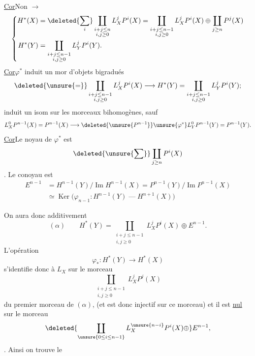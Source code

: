 \uline{Cor}\qquad Non $\longrightarrow$
\[
\left\{\begin{aligned}
H^*(X)&=\deleted{\sum_i}\coprod_{\substack{i+j\leq n\\i,j\geq0}}L_X^jP^i(X)
=\coprod_{\substack{i+j\leq n-1\\i,j\geq0}}L_X^jP^i(X)\oplus\coprod_{j\geq n}P^j(X)\\
H^*(Y)&=\coprod_{\substack{i+j\leq n-1\\i,j\geq0}}L_Y^jP^i(Y).
\end{aligned}\right.
\]
\uline{Cor}\qquad $\varphi^*$ induit un mor d'objets bigradués
\[
\deleted{\unsure{=}}\coprod_{\substack{i+j\leq n-1\\i,j\geq0}}L_X^jP^i(X)
\longrightarrow H^*(Y)=\coprod_{\substack{i+j\leq n-1\\i,j\geq0}}L_Y^jP^i(Y);\]
 induit un isom sur les morceaux bihomogènes, sauf
\[
L_X^0P^{n-1}(X)=P^{n-1}(X)\longrightarrow\deleted{\unsure{P^{n-1}}}\unsure{\varphi^*}L_Y^0P^{n-1}(Y)=P^{n-1}(Y).
\]
\uline{Cor}\qquad Le noyau de $\varphi^*$ est 
\[\deleted{\unsure{\sum}}\coprod_{j\geq n}P^i(X)\]
. Le conoyau est
\[
\begin{aligned}
E^{n-1}&=H^{n-1}(Y)/\operatorname{Im}H^{n-1}(X)=P^{n-1}(Y)/\operatorname{Im}P^{n-1}(X)\\
&\simeq\operatorname{Ker}\bigl(\varphi_{n-1}:H^{n-1}(Y)\mathrel{\text{---}}H^{n+1}(X)\bigr)
\end{aligned}
\]

On aura donc additivement
\[
(\alpha)\qquad H^*(Y)=\coprod_{\substack{i+j\leq n-1\\i,j\geq0}}L_X^jP^i(X)\oplus E^{n-1}.
\]
L'opération
\[\varphi_*:H^*(Y)\longrightarrow H^*(X)\]
s'identifie donc à $L_X$ sur le morceau
\[\coprod_{\substack{i+j\leq n-1\\i,j\geq0}}L_X^jP^j(X)\]
du premier morceau de $(\alpha)$, (et est  donc injectif sur ce morceau) et il est \uline{nul} sur le morceau
\[
\deleted{\coprod_{\unsure{0\leq i\leq n-1}}L_X^{\unsure{n-i}}P^i(X)\oplus}E^{n-1},
\]
. Ainsi on trouve le

